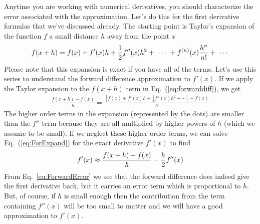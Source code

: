  Anytime you are
working with numerical derivatives, you should characterize the error
associated with the approximation.  Let's do this for the first
derivative formulas that we've discussed already. The starting point
is Taylor's expansion of the function $f$ a small distance $h$ away
from the point $x$ 
\begin{equation}\label{eq:Taylor}
    f(x+h) = f(x) + f'(x) h + {1 \over 2} f''(x) h^2 +
    ~\cdots~+ f^{(n)}(x) {h^n \over n!}
    +~\cdots
\end{equation}
Please note that this expansion is exact if you have all of the terms.
Let's use this series to understand the forward difference
approximation to $f'(x)$. If we apply the Taylor expansion to the
$f(x+h)$ term in Eq.~(\ref{eq:forwarddiff}), we get
\begin{eqnarray}\label{eq:ForExpand}
    \frac{f(x+h)-f(x)}{h}
    = \frac{\left[f(x)+f'(x)h + \frac{1}{2} f''(x) h^2 + \cdots \right]-f(x)}{h}
\end{eqnarray}
The higher order terms in the expansion (represented by the dots) are
smaller than the $f''$ term because they are all multiplied by higher
powers of $h$ (which we assume to be small). If we neglect these
higher order terms, we can solve Eq.~(\ref{eq:ForExpand}) for the
exact derivative $f'(x)$ to find
\begin{equation} \label{eq:ForwardError}
    f'(x) \approx {f(x+h)-f(x) \over h} - {h \over 2} f''(x)
\end{equation}
From Eq.~\eqref{eq:ForwardError} we see that the forward difference
does indeed give the first derivative back, but it carries an error
term which is proportional to $h$. But, of course, if $h$ is small
enough then the contribution from the term containing $f''(x)$ will
be too small to matter and we will have a good approximation to
$f'(x)$.


